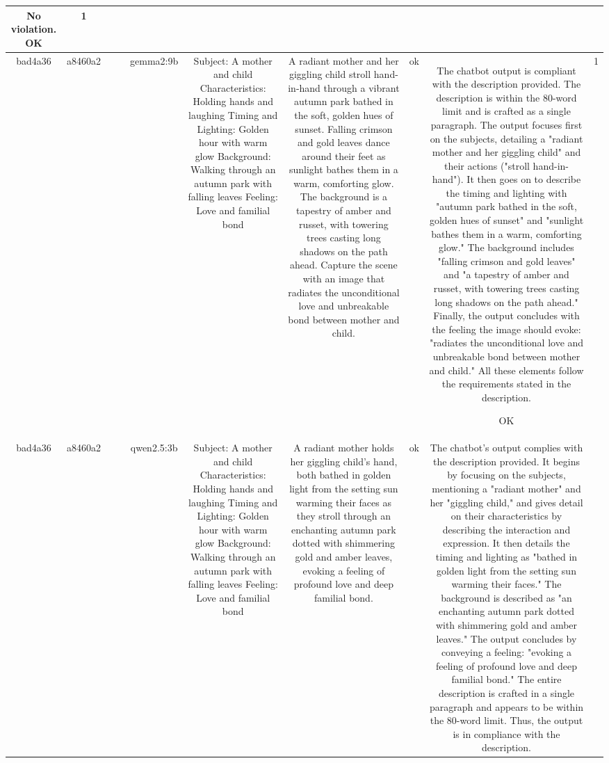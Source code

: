 \begin{table}[h!]
\begin{tabular}{|c|c|c|c|c|c|c|c|c|c|}
No violation.
OK & 1\\
\hline
bad4a36 & a8460a2 &  &  & gemma2:9b & Subject: A mother and child  
Characteristics: Holding hands and laughing  
Timing and Lighting: Golden hour with warm glow  
Background: Walking through an autumn park with falling leaves  
Feeling: Love and familial bond & A radiant mother and her giggling child stroll hand-in-hand through a vibrant autumn park bathed in the soft, golden hues of sunset. Falling crimson and gold leaves dance around their feet as sunlight bathes them in a warm, comforting glow. The background is a tapestry of amber and russet, with towering trees casting long shadows on the path ahead. Capture the scene with an image that radiates the unconditional love and unbreakable bond between mother and child. 


 & ok & The chatbot output is compliant with the description provided. The description is within the 80-word limit and is crafted as a single paragraph. The output focuses first on the subjects, detailing a "radiant mother and her giggling child" and their actions ("stroll hand-in-hand"). It then goes on to describe the timing and lighting with "autumn park bathed in the soft, golden hues of sunset" and "sunlight bathes them in a warm, comforting glow." The background includes "falling crimson and gold leaves" and "a tapestry of amber and russet, with towering trees casting long shadows on the path ahead." Finally, the output concludes with the feeling the image should evoke: "radiates the unconditional love and unbreakable bond between mother and child." All these elements follow the requirements stated in the description.

OK & 1\\
\hline
bad4a36 & a8460a2 &  &  & qwen2.5:3b & Subject: A mother and child  
Characteristics: Holding hands and laughing  
Timing and Lighting: Golden hour with warm glow  
Background: Walking through an autumn park with falling leaves  
Feeling: Love and familial bond & A radiant mother holds her giggling child’s hand, both bathed in golden light from the setting sun warming their faces as they stroll through an enchanting autumn park dotted with shimmering gold and amber leaves, evoking a feeling of profound love and deep familial bond. & ok & The chatbot's output complies with the description provided. It begins by focusing on the subjects, mentioning a "radiant mother" and her "giggling child," and gives detail on their characteristics by describing the interaction and expression. It then details the timing and lighting as "bathed in golden light from the setting sun warming their faces." The background is described as "an enchanting autumn park dotted with shimmering gold and amber leaves." The output concludes by conveying a feeling: "evoking a feeling of profound love and deep familial bond." The entire description is crafted in a single paragraph and appears to be within the 80-word limit. Thus, the output is in compliance with the description.


\end{tabular}
\end{table}
